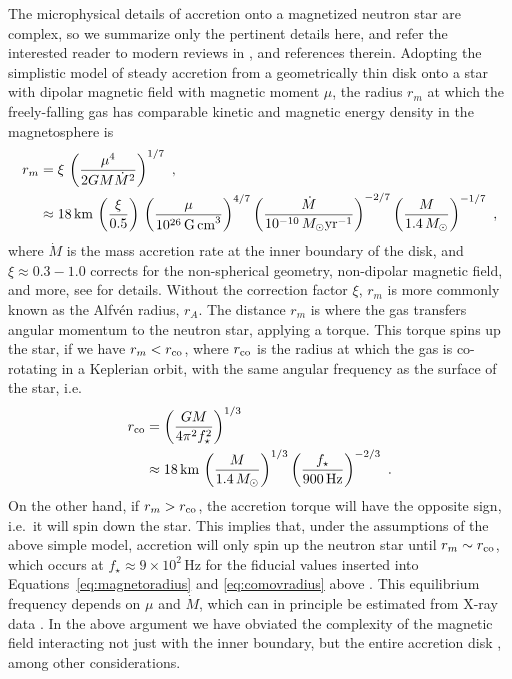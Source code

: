 The microphysical details of accretion onto a magnetized neutron star are complex, so we summarize only the pertinent details here, and refer the interested reader to modern reviews in \citet{Patruno2021,DiSalvo2022}, and references therein. Adopting the simplistic model of steady accretion from a geometrically thin disk onto a star with dipolar magnetic field with magnetic moment $\mu$, the radius $r_m$ at which the freely-falling gas has comparable kinetic and magnetic energy density in the magnetosphere is 
\begin{align}
    r_m &= \xi\, \left(\frac{\mu^4}{2 G M \dot{M}^2}\right)^{1/7}\ , \\
    &\approx 18\,\textrm{km}\, \left(\frac{\xi}{0.5}\right)\, \left(\frac{\mu}{10^{26}\,\textrm{G\,cm}^3}\right)^{4/7} \left(\frac{\dot{M}}{10^{-10}\,M_\odot\textrm{yr}^{-1}}\right)^{-2/7} \left(\frac{M}{1.4\,M_\odot}\right)^{-1/7}\ , \label{eq:magnetoradius}
\end{align} 
where $\dot{M}$ is the mass accretion rate at the inner boundary of the disk, and $\xi \approx 0.3-1.0$ corrects for the non-spherical geometry, non-dipolar magnetic field, and more, see \citet{DAngelo2010} for details. Without the correction factor $\xi$, $r_m$ is more commonly known as the Alfvén radius, $r_A$. The distance $r_m$ is where the gas transfers angular momentum to the neutron star, applying a torque. This torque spins up the star, if we have $r_m < r_{\rm co}$, where $r_{\rm co}$ is the radius at which the gas is co-rotating in a Keplerian orbit, with the same angular frequency as the surface of the star, i.e.
\begin{align}
    r_{\rm co} &= \left(\frac{GM}{4\pi^2 f_\star^2}\right)^{1/3} \\
    &\approx 18\,\textrm{km}\,\left(\frac{M}{1.4\,M_\odot}\right)^{1/3} \left(\frac{f_\star}{900\,\textrm{Hz}}\right)^{-2/3}\ . \label{eq:comovradius}
\end{align}
On the other hand, if $r_m > r_{\rm co}$, the accretion torque will have the opposite sign, i.e.~it will spin down the star. This implies that, under the assumptions of the above simple model, accretion will only spin up the neutron star until $r_m \sim r_{\rm co}$, which occurs at $f_\star \approx 9\times10^2\,$Hz for the fiducial values inserted into Equations~\eqref{eq:magnetoradius} and \eqref{eq:comovradius} above \citep{Ghosh1979a,White1997}. This equilibrium frequency depends on $\mu$ and $\dot{M}$, which can in principle be estimated from X-ray data \citep{Melatos2023}. In the above argument we have obviated the complexity of the magnetic field interacting not just with the inner boundary, but the entire accretion disk \citep{Wang1987,Rappaport2004}, among other considerations. 

